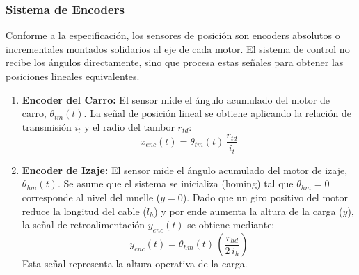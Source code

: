 \documentclass[11pt]{article}                                    %
\begin{document}
\subsubsection{Sistema de Encoders}
Conforme a la especificación, los sensores de posición son encoders absolutos o incrementales montados solidarios al eje de cada motor.
El sistema de control no recibe los ángulos directamente, sino que procesa estas señales para obtener las posiciones lineales equivalentes.
\begin{enumerate}
    \item \textbf{Encoder del Carro:} El sensor mide el ángulo acumulado del motor de carro, $\theta_{tm}(t)$. La señal de posición lineal se obtiene aplicando la relación de transmisión $i_t$ y el radio del tambor $r_{td}$:
    \begin{equation}
        x_{enc}(t) = \theta_{tm}(t) \, \frac{r_{td}}{i_t}
    \end{equation}

    \item \textbf{Encoder de Izaje:} El sensor mide el ángulo acumulado del motor de izaje, $\theta_{hm}(t)$. Se asume que el sistema se inicializa (homing) tal que $\theta_{hm}=0$ corresponde al nivel del muelle ($y=0$). Dado que un giro positivo del motor reduce la longitud del cable ($l_h$) y por ende aumenta la altura de la carga ($y$), la señal de retroalimentación $y_{enc}(t)$ se obtiene mediante:
    \begin{equation}
        y_{enc}(t) = \theta_{hm}(t) \, \left( \frac{r_{hd}}{2 \, i_h} \right)
    \end{equation}
    Esta señal representa la altura operativa de la carga.
\end{enumerate}
\end{document}
